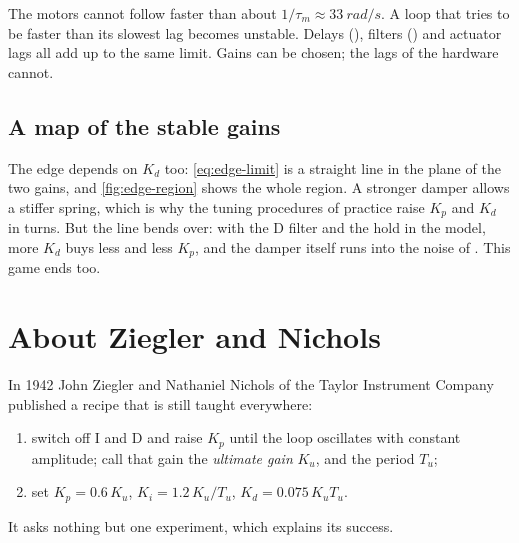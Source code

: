 
\begin{keyidea}
The motors cannot follow faster than about $1/\tau_m \approx \SI{33}{rad/s}$. A loop that tries to be faster than its slowest lag becomes unstable. Delays (), filters () and actuator lags all add up to the same limit. Gains can be chosen; the lags of the hardware cannot.
\end{keyidea}

\subsection{A map of the stable gains}
The edge depends on $K_d$ too: \cref{eq:edge-limit} is a straight line in the plane of the two gains, and \cref{fig:edge-region} shows the whole region. A stronger damper allows a stiffer spring, which is why the tuning procedures of practice raise $K_p$ and $K_d$ in turns. But the line bends over: with the D filter and the hold in the model, more $K_d$ buys less and less $K_p$, and the damper itself runs into the noise of . This game ends too.


\section{About Ziegler and Nichols}

In 1942 John Ziegler and Nathaniel Nichols of the Taylor Instrument Company published a recipe that is still taught everywhere:
\begin{enumerate}
  \item switch off I and D and raise $K_p$ until the loop oscillates with constant amplitude; call that gain the \emph{ultimate gain} $K_u$, and the period $T_u$;
  \item set $K_p = 0.6\,K_u$, $K_i = 1.2\,K_u/T_u$, $K_d = 0.075\,K_uT_u$.
\end{enumerate}
It asks nothing but one experiment, which explains its success.

